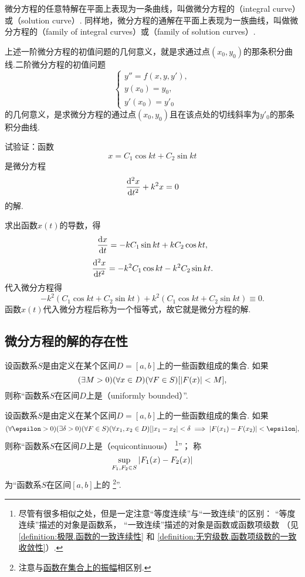 微分方程的任意特解在平面上表现为一条曲线，叫做微分方程的（integral curve）或（solution curve）.
同样地，微分方程的通解在平面上表现为一族曲线，叫做微分方程的（family of integral curves）或（family of solution curves）.

上述一阶微分方程的初值问题的几何意义，就是求通过点\((x_0,y_0)\)的那条积分曲线.二阶微分方程的初值问题\[
\left\{ \begin{array}{l}
y'' = f(x,y,y'), \\
y(x_0) = y_0, \\
y'(x_0) = y'_0
\end{array} \right.
\]的几何意义，是求微分方程的通过点\((x_0,y_0)\)且在该点处的切线斜率为\(y'_0\)的那条积分曲线.

\begin{example}
试验证：函数\[
x = C_1 \cos kt + C_2 \sin kt
\]是微分方程\[
\dv[2]{x}{t} + k^2 x = 0
\]的解.
\begin{solution}
求出函数\(x(t)\)的导数，得\[
\dv{x}{t} = -k C_1 \sin kt + k C_2 \cos kt,
\]\[
\dv[2]{x}{t} = -k^2 C_1 \cos kt - k^2 C_2 \sin kt.
\]代入微分方程得\[
-k^2 (C_1 \cos kt + C_2 \sin kt) + k^2 (C_1 \cos kt + C_2 \sin kt)
\equiv 0.
\]
函数\(x(t)\)代入微分方程后称为一个恒等式，故它就是微分方程的解.
\end{solution}
\end{example}

\subsection{微分方程的解的存在性}
\begin{definition}\label{definition:微分方程.函数系的一致有界性}
设函数系\(S\)是由定义在某个区间\(D = [a,b]\)上的一些函数组成的集合.
如果\[
	(\exists M>0)
	(\forall x \in D)
	(\forall F \in S)
	[\abs{F(x)} < M],
\]
则称“函数系\(S\)在区间\(D\)上是（uniformly bounded）”.
\end{definition}

\begin{definition}\label{definition:微分方程.函数系的等度连续性}
设函数系\(S\)是由定义在某个区间\(D = [a,b]\)上的一些函数组成的集合.
如果\[
	(\forall\epsilon>0)
	(\exists\delta>0)
	(\forall F \in S)
	(\forall x_1,x_2 \in D)
	[\abs{x_1-x_2} < \delta \implies \abs{F(x_1)-F(x_2)} < \epsilon],
\]
则称“函数系\(S\)在区间\(D\)上是（equicontinuous）%
\footnote{尽管有很多相似之处，但是一定注意“等度连续”与“一致连续”的区别：
“等度连续”描述的对象是函数系，
“一致连续”描述的对象是函数或函数项级数
（见\cref{definition:极限.函数的一致连续性} 和
\cref{definition:无穷级数.函数项级数的一致收敛性}）.}”；
称\[
	\sup_{F_1,F_2 \in S} \abs{F_1(x)-F_2(x)}
\]为“函数系\(S\)在区间\([a,b]\)上的%
\footnote{注意与\hyperref[definition:极限.函数在集合上的振幅]{函数在集合上的振幅}相区别.}”.
\end{definition}

